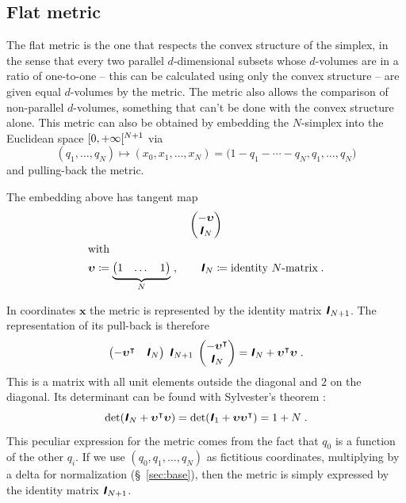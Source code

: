 \documentclass[\ifafour a4paper,12pt,\else a5paper,10pt,\fi%
onecolumn,oneside,article,%
british%
]{memoir}
\theoremstyle{remark}
\theoremstyle{innote}
\newcommand*{\mathte}[1]{\textbf{\textit{\textsf{#1}}}}
\newcommand*{\citep}{\parencites}
\newcommand*{\defd}{\coloneqq}
\DeclarePairedDelimiter\clop{[}{[}
\renewcommand*{\|}[1][]{\nonscript\,#1\vert\nonscript\;\mathopen{}}
\newcommand*{\sect}{\S}%
\newcommand*{\T}{^\intercal}%
\newcommand*{\yu}{\bm{\upsilon}}
\newcommand*{\yid}{\mathte{I}}
\newcommand*{\yx}{\bm{x}}
\begin{document}
\subsection{Flat metric}
\label{sec:flat_metric}

The flat metric is the one that respects the convex structure of the
simplex, in the sense that every two parallel $d$-dimensional subsets whose
$d$-volumes are in a ratio of one-to-one -- this can be calculated using
only the convex structure \citep{portamana2011_r2019} -- are given equal
$d$-volumes by the metric. The metric also allows the comparison of
non-parallel $d$-volumes, something that can't be done with the convex
structure alone. This metric can also be obtained by embedding the
$N$-simplex into the Euclidean space $\clop{0,+\infty}^{N+1}$ via
\begin{equation}
  \label{eq:flat_embedding}
  (q_1, \dotsc, q_N) \mapsto (x_0, x_1,\dotsc, x_N) =
  \bigl( 1-q_1 -\dotsb -q_N, q_1, \dotsc, q_N \bigr)
\end{equation}
and pulling-back the metric.

The embedding above has tangent map
\begin{gather}
  \label{eq:tangent_map_canonical}
  \begin{pmatrix}
-\yu \\ \yid_N    
\end{pmatrix}
\\\shortintertext{with}
\label{eq:def_u}
\yu \defd
\underbrace{\begin{pmatrix}
  1 &\dotso &1
\end{pmatrix}}_{N}\;,
\qquad
\yid_{N} \defd \text{identity $N$-matrix}\;.
\end{gather}

In coordinates $\yx$ the metric is represented by the identity matrix
$\yid_{N+1}$. The representation of its pull-back is therefore
\begin{equation}
  \label{eq:metric_pullback}
  \begin{pmatrix}
-\yu\T & \yid_N    
\end{pmatrix}
\;
\yid_{N+1}
\;
  \begin{pmatrix}
-\yu\T \\ \yid_N    
\end{pmatrix}
= \yid_N + \yu\T\yu\;.
\end{equation}
This is a matrix with all unit elements outside the diagonal and $2$ on the
diagonal. Its determinant can be found with Sylvester's theorem
\citep{sylvester1851,akritasetal1996}:
\begin{equation}
  \label{eq:sylvester}
  \det(\yid_N + \yu\T\yu) = \det(\yid_1 + \yu\yu\T) = 1 + N\;.
\end{equation}
This peculiar expression for the metric comes from the fact that $q_0$ is
a function of the other $q_i$. If we use $(q_0, q_1, \dotsc, q_N)$
as fictitious coordinates, multiplying by a delta for normalization
(\sect~\ref{sec:base}), then the metric is simply expressed by the identity
matrix $\yid_{N+1}$.
\end{document}

